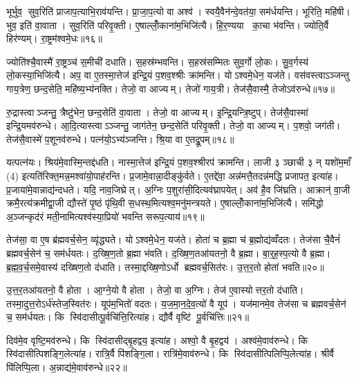भूर्भुव॒ सुव॒रिति॑ प्राजाप॒त्याभि॒राव॑यन्ति। प्रा॒जा॒प॒त्यो वा अश्व॑। स्वयै॒वैन॑न्दे॒वत॑या॒ सम॑र्धयन्ति। भूरिति॒ महि॑षी। भुव॒ इति॑ वा॒वाता। सुव॒रिति॑ परिवृ॒क्ती। ए॒षाल्लोँ॒काना॑म॒भिजि॑त्यै। हि॒र॒ण्यया का॒चा भ॑वन्ति। ज्योति॒र्वै हिर॑ण्यम्। रा॒ष्ट्रम॑श्वमे॒धः॥१६॥

ज्योति॑श्चै॒वास्मै॑ रा॒ष्ट्रञ्च॑ स॒मीची॑ दधाति। स॒हस्र॑म्भवन्ति। स॒हस्र॑सम्मितः सुव॒र्गो लो॒कः। सु॒व॒र्गस्य॑ लो॒कस्या॒भिजि॑त्यै। अप॒ वा ए॒तस्मा॒त्तेज॑ इन्द्रि॒यं प॒शव॒श्श्रीः क्रा॑मन्ति। योऽश्वमे॒धेन॒ यज॑ते। वस॑वस्त्वाऽञ्जन्तु गाय॒त्रेण॒ छन्द॒सेति॒ महि॑ष्य॒भ्य॑नक्ति। तेजो॒ वा आज्यम्। तेजो॑ गाय॒त्री। तेज॑सै॒वास्मै॒ तेजोऽव॑रुन्धे॥१७॥

रु॒द्रास्त्वाञ्जन्तु॒ त्रैष्टु॑भेन॒ छन्द॒सेति॑ वा॒वाता। तेजो॒ वा आज्यम्। इ॒न्द्रि॒यन्त्रि॒ष्टुप्। तेज॑सै॒वास्मा॑ इन्द्रि॒यमव॑रुन्धे। आ॒दि॒त्यास्त्वाऽञ्जन्तु॒ जाग॑तेन॒ छन्द॒सेति॑ परिवृ॒क्ती। तेजो॒ वा आज्यम्। प॒शवो॒ जग॑ती। तेज॑सै॒वास्मे॑ प॒शूनव॑रुन्धे। पत्न॑यो॒ऽभ्य॑ञ्जन्ति। श्रि॒या वा ए॒तद्रू॒पम्॥१८॥

यत्पत्न॑यः। श्रिय॑मे॒वास्मि॒न्तद्द॑धति। नास्मा॒त्तेज॑ इन्द्रि॒यं प॒शव॒श्श्रीरप॑ क्रामन्ति। लाजी ३ ञ्छाची ३ न् यशो॑म॒माँ (4) इत्यति॑रिक्त॒मन्न॒मश्वा॑यो॒पाह॑रन्ति। प्र॒जामे॒वान्ना॒दीङ्कु॑र्वते। ए॒तद्दे॑वा॒ अन्न॑मत्तै॒तदन्न॑मद्धि प्रजापत॒ इत्या॑ह। प्र॒जाया॑मे॒वान्नाद्य॑न्दधते। यदि॒ नाव॒जिघ्रेत्। अ॒ग्निः प॒शुरा॑सी॒दित्यव॑घ्रापयेत्। अव॑ है॒व जि॑घ्रति। आक्रान्॑ वा॒जी क्रमै॒रत्य॑क्रमीद्वा॒जी द्यौस्ते॑ पृ॒ष्ठं पृ॑थि॒वी स॒धस्थ॒मित्यश्व॒मनु॑मन्त्रयते। ए॒षाल्लोँ॒काना॑म॒भिजि॑त्यै। समि॑द्धो अ॒ञ्जन्कृद॑रं मती॒नामित्यश्व॑स्या॒प्रियो॑ भवन्ति सरूप॒त्याय॑॥१९॥\anuvakamend[परि॑त॒स्थुष॒ इत्या॑हे॒मे ए॒वास्मै॑ युनक्त्य॒भिजि॑त्यै भरन्त्यश्वमे॒धो रु॑न्धे रू॒पञ्जि॑घ्रति॒ त्रीणि॑ च]

तेज॑सा॒ वा ए॒ष ब्र॑ह्मवर्च॒सेन॒ व्यृ॑द्ध्यते। योऽश्वमे॒धेन॒ यज॑ते। होता॑ च ब्र॒ह्मा च॑ ब्र॒ह्मोद्य॑व्वँदतः। तेज॑सा चै॒वैनं॑ ब्रह्मवर्च॒सेन॑ च॒ सम॑र्धयतः। द॒ख्षि॒ण॒तो ब्र॒ह्मा भ॑वति। द॒ख्षि॒ण॒तआ॑यतनो॒ वै ब्र॒ह्मा। बा॒र्॒ह॒स्प॒त्यो वै ब्र॒ह्मा। ब्र॒ह्म॒व॒र्च॒समे॒वास्य॑ दख्षिण॒तो द॑धाति। तस्मा॒द्दख्षि॒णोऽर्धो ब्रह्मवर्च॒सित॑रः। उ॒त्त॒र॒तो होता॑ भवति॥२०॥

उ॒त्त॒र॒तआ॑यतनो॒ वै होता। आ॒ग्ने॒यो वै होता। तेजो॒ वा अ॒ग्निः। तेज॑ ए॒वास्योत्तर॒तो द॑धाति। तस्मा॒दुत्त॒रोऽर्ध॑स्तेज॒स्वित॑रः। यूप॑म॒भितो॑ वदतः। य॒ज॒मा॒न॒दे॒व॒त्यो॑ वै यूप॑। यज॑मानमे॒व तेज॑सा च ब्रह्मवर्च॒सेन॑ च॒ सम॑र्धयतः। कि स्वि॑दासीत्पू॒र्वचि॑त्ति॒रित्या॑ह। द्यौर्वै वृष्टि॑ पू॒र्वचि॑त्तिः॥२१॥

दिव॑मे॒व वृष्टि॒मव॑रुन्धे। कि स्वि॑दासीद्बृ॒हद्वय॒ इत्या॑ह। अश्वो॒ वै बृ॒हद्वय॑। अश्व॑मे॒वाव॑रुन्धे। कि स्वि॑दासीत्पिशङ्गि॒लेत्या॑ह। रात्रि॒र्वै पि॑शङ्गि॒ला। रात्रि॑मे॒वाव॑रुन्धे। कि स्वि॑दासीत्पिलिप्पि॒लेत्या॑ह। श्रीर्वै पि॑लिप्पि॒ला। अ॒न्नाद्य॑मे॒वाव॑रुन्धे॥२२॥


